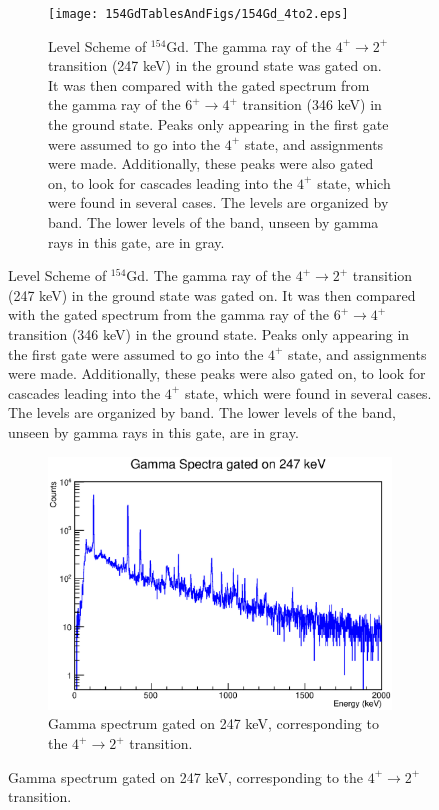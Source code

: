 \begin{landscape}
\begin{figure}[!]
    \centering
    \begin{subfigure}{1.4\textwidth}
    \texttt{[image: 154GdTablesAndFigs/154Gd\_4to2.eps]}
    \caption{\label{fig:154_4to2level}Level Scheme of $^{154}$Gd. The gamma ray of the $4^+\rightarrow2^+$ transition (247 keV) in the ground state was gated on. It was then compared with the gated spectrum from the gamma ray of the $6^+\rightarrow4^+$ transition (346 keV) in the ground state. Peaks only appearing in the first gate were assumed to go into the $4^+$ state, and assignments were made. Additionally, these peaks were also gated on, to look for cascades leading into the $4^+$ state, which were found in several cases. The levels are organized by band. The lower levels of the band, unseen by gamma rays in this gate, are in gray.}
    \end{subfigure}
    \label{fig:154_4to2}
    \end{figure}
    \begin{figure}
    \ContinuedFloat
    \begin{subfigure}{1.4\textwidth}
    \includegraphics[]{154GdTablesAndFigs/247GateSpectrum.eps}
    \caption{Gamma spectrum gated on 247 keV, corresponding to the $4^+\rightarrow2^+$ transition.}
    \label{fig:154_4to2spec}
    \end{subfigure}
\end{figure}
\end{landscape}